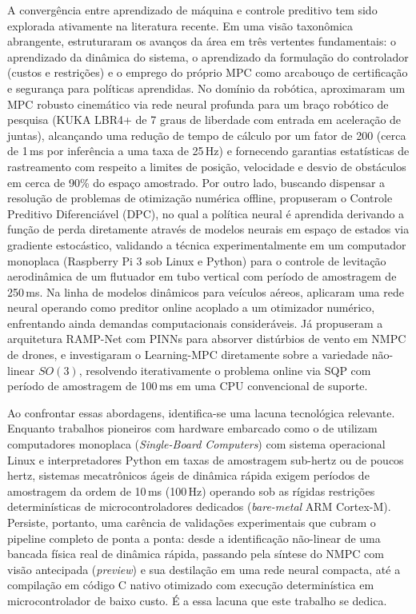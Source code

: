A convergência entre aprendizado de máquina e controle preditivo tem sido explorada ativamente na literatura recente. Em uma visão taxonômica abrangente,  estruturaram os avanços da área em três vertentes fundamentais: o aprendizado da dinâmica do sistema, o aprendizado da formulação do controlador (custos e restrições) e o emprego do próprio MPC como arcabouço de certificação e segurança para políticas aprendidas. No domínio da robótica,  aproximaram um MPC robusto cinemático via rede neural profunda para um braço robótico de pesquisa (KUKA LBR4+ de 7 graus de liberdade com entrada em aceleração de juntas), alcançando uma redução de tempo de cálculo por um fator de 200 (cerca de 1\,ms por inferência a uma taxa de 25\,Hz) e fornecendo garantias estatísticas de rastreamento com respeito a limites de posição, velocidade e desvio de obstáculos em cerca de 90\% do espaço amostrado. Por outro lado, buscando dispensar a resolução de problemas de otimização numérica offline,  propuseram o Controle Preditivo Diferenciável (DPC), no qual a política neural é aprendida derivando a função de perda diretamente através de modelos neurais em espaço de estados via gradiente estocástico, validando a técnica experimentalmente em um computador monoplaca (Raspberry Pi 3 sob Linux e Python) para o controle de levitação aerodinâmica de um flutuador em tubo vertical com período de amostragem de 250\,ms. Na linha de modelos dinâmicos para veículos aéreos,  aplicaram uma rede neural operando como preditor online acoplado a um otimizador numérico, enfrentando ainda demandas computacionais consideráveis. Já  propuseram a arquitetura RAMP-Net com PINNs para absorver distúrbios de vento em NMPC de drones, e  investigaram o Learning-MPC diretamente sobre a variedade não-linear $SO(3)$, resolvendo iterativamente o problema online via SQP com período de amostragem de 100\,ms em uma CPU convencional de suporte.

Ao confrontar essas abordagens, identifica-se uma lacuna tecnológica relevante. Enquanto trabalhos pioneiros com hardware embarcado como o de  utilizam computadores monoplaca (\textit{Single-Board Computers}) com sistema operacional Linux e interpretadores Python em taxas de amostragem sub-hertz ou de poucos hertz, sistemas mecatrônicos ágeis de dinâmica rápida exigem períodos de amostragem da ordem de 10\,ms (100\,Hz) operando sob as rígidas restrições determinísticas de microcontroladores dedicados (\textit{bare-metal} ARM Cortex-M). Persiste, portanto, uma carência de validações experimentais que cubram o pipeline completo de ponta a ponta: desde a identificação não-linear de uma bancada física real de dinâmica rápida, passando pela síntese do NMPC com visão antecipada (\textit{preview}) e sua destilação em uma rede neural compacta, até a compilação em código C nativo otimizado com execução determinística em microcontrolador de baixo custo. É a essa lacuna que este trabalho se dedica.

